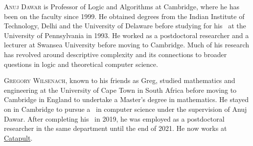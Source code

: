 \documentclass{toc}
\begin{document}
\begin{tocaboutauthors}
\begin{tocabout}[dawar]%
  \textsc{Anuj Dawar}  %
  is Professor of Logic and Algorithms at Cambridge, where he has been on the faculty since 1999.  He obtained degrees from the Indian Institute of Technology, Delhi and the University of Delaware before studying for his \phd\ at the University of Pennsylvania in 1993.  He worked as a %
postdoctoral  %
researcher and a lecturer at Swansea University before moving to Cambridge.  Much of his research has revolved around descriptive complexity and its connections to broader questions in logic and theoretical computer science.
\end{tocabout}
\begin{tocabout}[wilsenach]
\textsc{Gregory Wilsenach}, known to his friends as Greg, studied mathematics and engineering at the University of Cape Town in South Africa before moving to Cambridge in England to undertake a %
Master's  %
degree in mathematics.  He stayed on in Cambridge to pursue a \phd\ in computer science under the supervision of Anuj Dawar.  After completing his \phd\ in 2019, he was employed as a 
%
postdoctoral  %
researcher in the same department until the end of 2021.  He now works at \href{https://www.catapult.xyz}{Catapult}.
%
%
\end{tocabout}
\end{tocaboutauthors}
\end{document}
